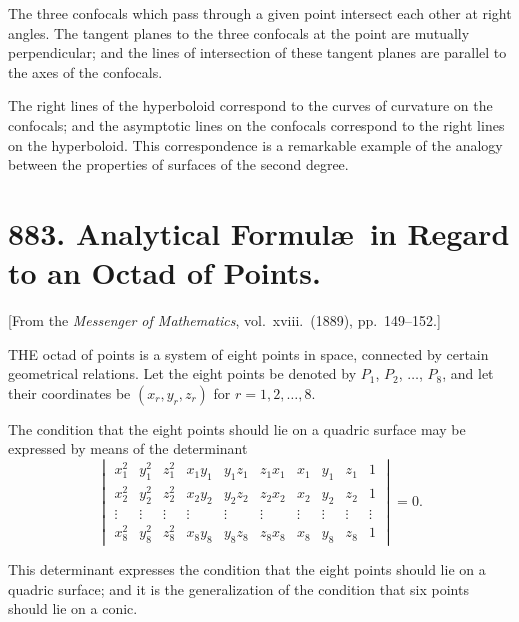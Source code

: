 \documentclass[12pt,a4paper]{article}
\theoremstyle{plain}
\begin{document}
\medskip\noindent
The three confocals which pass through a given point intersect each other at right angles. The tangent planes to the three confocals at the point are mutually perpendicular; and the lines of intersection of these tangent planes are parallel to the axes of the confocals.

\medskip\noindent
The right lines of the hyperboloid correspond to the curves of curvature on the confocals; and the asymptotic lines on the confocals correspond to the right lines on the hyperboloid. This correspondence is a remarkable example of the analogy between the properties of surfaces of the second degree.

\newpage
\section[883]{883. Analytical Formul\ae\ in Regard to an Octad of Points.}
\label{sec:883}

[From the \textit{Messenger of Mathematics}, vol.\ xviii.\ (1889), pp.\ 149--152.]

\medskip\noindent
THE octad of points is a system of eight points in space, connected by certain geometrical relations. Let the eight points be denoted by $P_{1}$, $P_{2}$, $\ldots$, $P_{8}$, and let their coordinates be $(x_{r}, y_{r}, z_{r})$ for $r = 1, 2, \ldots, 8$.

\medskip\noindent
The condition that the eight points should lie on a quadric surface may be expressed by means of the determinant
\[
\begin{vmatrix}
x_{1}^{2} & y_{1}^{2} & z_{1}^{2} & x_{1}y_{1} & y_{1}z_{1} & z_{1}x_{1} & x_{1} & y_{1} & z_{1} & 1 \\
x_{2}^{2} & y_{2}^{2} & z_{2}^{2} & x_{2}y_{2} & y_{2}z_{2} & z_{2}x_{2} & x_{2} & y_{2} & z_{2} & 1 \\
\vdots & \vdots & \vdots & \vdots & \vdots & \vdots & \vdots & \vdots & \vdots & \vdots \\
x_{8}^{2} & y_{8}^{2} & z_{8}^{2} & x_{8}y_{8} & y_{8}z_{8} & z_{8}x_{8} & x_{8} & y_{8} & z_{8} & 1
\end{vmatrix} = 0.
\]

\medskip\noindent
This determinant expresses the condition that the eight points should lie on a quadric surface; and it is the generalization of the condition that six points should lie on a conic.
\end{document}

